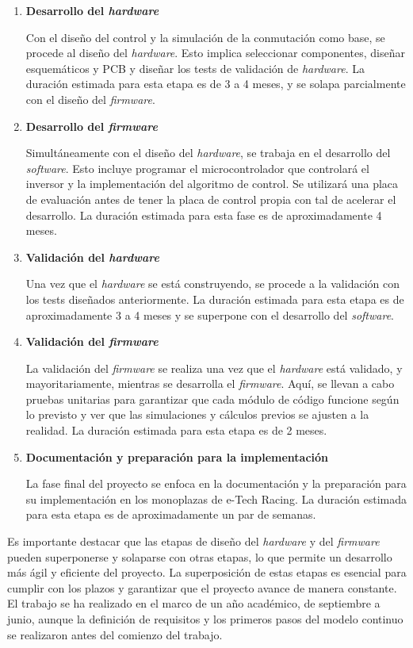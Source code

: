 \begin{enumerate}
\item \textbf{Desarrollo del \textit{hardware}}

Con el diseño del control y la simulación de la conmutación como base, se procede al diseño del \textit{hardware}. Esto implica seleccionar componentes, diseñar esquemáticos y PCB y diseñar los tests de validación de \textit{hardware}. La duración estimada para esta etapa es de 3 a 4 meses, y se solapa parcialmente con el diseño del \textit{firmware}.

\item \textbf{Desarrollo del \textit{firmware}}

Simultáneamente con el diseño del \textit{hardware}, se trabaja en el desarrollo del \textit{software}. Esto incluye programar el microcontrolador que controlará el inversor y la implementación del algoritmo de control. Se utilizará una placa de evaluación antes de tener la placa de control propia con tal de acelerar el desarrollo. La duración estimada para esta fase es de aproximadamente 4 meses.

\item \textbf{Validación del \textit{hardware}}

Una vez que el \textit{hardware} se está construyendo, se procede a la validación con los tests diseñados anteriormente. La duración estimada para esta etapa es de aproximadamente 3 a 4 meses y se superpone con el desarrollo del \textit{software}.

\item \textbf{Validación del \textit{firmware}}

La validación del \textit{firmware} se realiza una vez que el \textit{hardware} está validado, y mayoritariamente, mientras se desarrolla el \textit{firmware}. Aquí, se llevan a cabo pruebas unitarias para garantizar que cada módulo de código funcione según lo previsto y ver que las simulaciones y cálculos previos se ajusten a la realidad. La duración estimada para esta etapa es de 2 meses.

\item \textbf{Documentación y preparación para la implementación}

La fase final del proyecto se enfoca en la documentación y la preparación para su implementación en los monoplazas de e-Tech Racing. La duración estimada para esta etapa es de aproximadamente un par de semanas. 

\end{enumerate}

Es importante destacar que las etapas de diseño del \textit{hardware} y del \textit{firmware} pueden superponerse y solaparse con otras etapas, lo que permite un desarrollo más ágil y eficiente del proyecto. La superposición de estas etapas es esencial para cumplir con los plazos y garantizar que el proyecto avance de manera constante. El trabajo se ha realizado en el marco de un año académico, de septiembre a junio, aunque la definición de requisitos y los primeros pasos del modelo continuo se realizaron antes del comienzo del trabajo.

